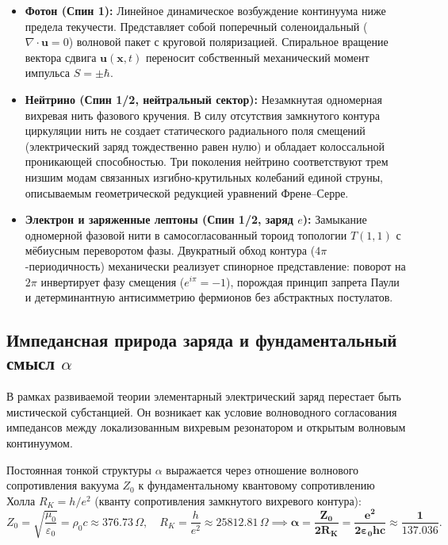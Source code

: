 \documentclass[11pt,a4paper]{article}
\theoremstyle{definition}
\theoremstyle{remark}
\begin{document}

\begin{itemize}
    \item \textbf{Фотон (Спин 1):} Линейное динамическое возбуждение континуума ниже предела текучести. Представляет собой поперечный соленоидальный ($\nabla \cdot \mathbf{u} = 0$) волновой пакет с круговой поляризацией. Спиральное вращение вектора сдвига $\mathbf{u}(\mathbf{x}, t)$ переносит собственный механический момент импульса $S = \pm \hbar$.
    
    \item \textbf{Нейтрино (Спин 1/2, нейтральный сектор):} Незамкнутая одномерная вихревая нить фазового кручения. В силу отсутствия замкнутого контура циркуляции нить не создает статического радиального поля смещений (электрический заряд тождественно равен нулю) и обладает колоссальной проникающей способностью. Три поколения нейтрино соответствуют трем низшим модам связанных изгибно-крутильных колебаний единой струны, описываемым геометрической редукцией уравнений Френе--Серре.
    
    \item \textbf{Электрон и заряженные лептоны (Спин 1/2, заряд $e$):} Замыкание одномерной фазовой нити в самосогласованный тороид топологии $T(1,1)$ с мёбиусным переворотом фазы. Двукратный обход контура ($4\pi$-периодичность) механически реализует спинорное представление: поворот на $2\pi$ инвертирует фазу смещения ($e^{i\pi} = -1$), порождая принцип запрета Паули и детерминантную антисимметрию фермионов без абстрактных постулатов.
\end{itemize}

\subsection{Импедансная природа заряда и фундаментальный смысл $\alpha$}
В рамках развиваемой теории элементарный электрический заряд перестает быть мистической субстанцией. Он возникает как условие волноводного согласования импедансов между локализованным вихревым резонатором и открытым волновым континуумом.

Постоянная тонкой структуры $\alpha$ выражается через отношение волнового сопротивления вакуума $Z_0$ к фундаментальному квантовому сопротивлению Холла $R_K = h/e^2$ (кванту сопротивления замкнутого вихревого контура):
\begin{equation}
    Z_0 = \sqrt{\frac{\mu_0}{\varepsilon_0}} = \rho_0 c \approx 376.73\,\Omega, \quad R_K = \frac{h}{e^2} \approx 25812.81\,\Omega \implies \mathbf{\alpha = \frac{Z_0}{2 R_K} = \frac{e^2}{2 \varepsilon_0 h c} \approx \frac{1}{137.036}}.
\end{equation}
\end{document}
